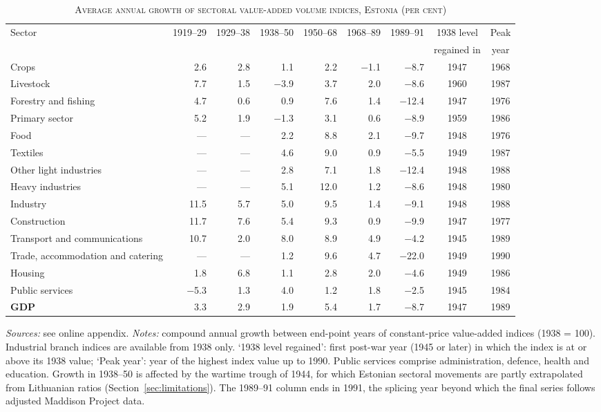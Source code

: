 \begin{table}[htbp]
\centering\scriptsize\setlength{\tabcolsep}{3pt}
\caption[Average annual growth of sectoral value-added volume indices, Estonia (per cent)]{\textsc{Average annual growth of sectoral value-added volume indices, Estonia (per cent)}}
\label{tab:sectoral}
\begin{threeparttable}
\begin{tabular}{lrrrrrrcc}
\toprule
Sector & 1919--29 & 1929--38 & 1938--50 & 1950--68 & 1968--89 & 1989--91 & 1938 level & Peak \\
& & & & & & & regained in & year \\
\midrule
Crops & 2.6 & 2.8 & 1.1 & 2.2 & $-$1.1 & $-$8.7 & 1947 & 1968 \\
Livestock & 7.7 & 1.5 & $-$3.9 & 3.7 & 2.0 & $-$8.6 & 1960 & 1987 \\
Forestry and fishing & 4.7 & 0.6 & 0.9 & 7.6 & 1.4 & $-$12.4 & 1947 & 1976 \\
\quad Primary sector & 5.2 & 1.9 & $-$1.3 & 3.1 & 0.6 & $-$8.9 & 1959 & 1986 \\
\midrule
Food & --- & --- & 2.2 & 8.8 & 2.1 & $-$9.7 & 1948 & 1976 \\
Textiles & --- & --- & 4.6 & 9.0 & 0.9 & $-$5.5 & 1949 & 1987 \\
Other light industries & --- & --- & 2.8 & 7.1 & 1.8 & $-$12.4 & 1948 & 1988 \\
Heavy industries & --- & --- & 5.1 & 12.0 & 1.2 & $-$8.6 & 1948 & 1980 \\
\quad Industry & 11.5 & 5.7 & 5.0 & 9.5 & 1.4 & $-$9.1 & 1948 & 1988 \\
\midrule
Construction & 11.7 & 7.6 & 5.4 & 9.3 & 0.9 & $-$9.9 & 1947 & 1977 \\
Transport and communications & 10.7 & 2.0 & 8.0 & 8.9 & 4.9 & $-$4.2 & 1945 & 1989 \\
Trade, accommodation and catering & --- & --- & 1.2 & 9.6 & 4.7 & $-$22.0 & 1949 & 1990 \\
Housing & 1.8 & 6.8 & 1.1 & 2.8 & 2.0 & $-$4.6 & 1949 & 1986 \\
Public services & $-$5.3 & 1.3 & 4.0 & 1.2 & 1.8 & $-$2.5 & 1945 & 1984 \\
\midrule
\textbf{GDP} & 3.3 & 2.9 & 1.9 & 5.4 & 1.7 & $-$8.7 & 1947 & 1989 \\
\bottomrule
\end{tabular}
\begin{tablenotes}
\footnotesize
\textit{Sources:} see online appendix. \textit{Notes:} compound annual growth between end-point years of constant-price value-added indices (1938 = 100). Industrial branch indices are available from 1938 only. `1938 level regained': first post-war year (1945 or later) in which the index is at or above its 1938 value; `Peak year': year of the highest index value up to 1990. Public services comprise administration, defence, health and education. Growth in 1938--50 is affected by the wartime trough of 1944, for which Estonian sectoral movements are partly extrapolated from Lithuanian ratios (Section~\ref{sec:limitations}). The 1989--91 column ends in 1991, the splicing year beyond which the final series follows adjusted Maddison Project data.

\end{tablenotes}
\end{threeparttable}
\end{table}
